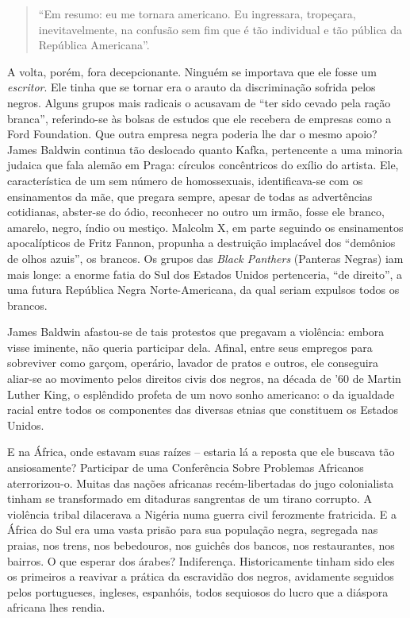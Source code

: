 \documentclass[
  letterpaper,
  DIV=11,
  numbers=noendperiod]{scrreprt}
\begin{document}
\begin{quote}
``Em resumo: eu me tornara americano. Eu ingressara, tropeçara,
inevitavelmente, na confusão sem fim que é tão individual e tão pública
da República Americana''.
\end{quote}

A volta, porém, fora decepcionante. Ninguém se importava que ele fosse
um \emph{escritor}. Ele tinha que se tornar era o arauto da
discriminação sofrida pelos negros. Alguns grupos mais radicais o
acusavam de ``ter sido cevado pela ração branca'', referindo-se às
bolsas de estudos que ele recebera de empresas como a Ford Foundation.
Que outra empresa negra poderia lhe dar o mesmo apoio? James Baldwin
continua tão deslocado quanto Kafka, pertencente a uma minoria judaica
que fala alemão em Praga: círculos concêntricos do exílio do artista.
Ele, característica de um sem número de homossexuais, identificava-se
com os ensinamentos da mãe, que pregara sempre, apesar de todas as
advertências cotidianas, abster-se do ódio, reconhecer no outro um
irmão, fosse ele branco, amarelo, negro, índio ou mestiço. Malcolm X, em
parte seguindo os ensinamentos apocalípticos de Fritz Fannon, propunha a
destruição implacável dos ``demônios de olhos azuis'', os brancos. Os
grupos das \emph{Black Panthers} (Panteras Negras) iam mais longe: a
enorme fatia do Sul dos Estados Unidos pertenceria, ``de direito'', a
uma futura República Negra Norte-Americana, da qual seriam expulsos
todos os brancos.

James Baldwin afastou-se de tais protestos que pregavam a violência:
embora visse iminente, não queria participar dela. Afinal, entre seus
empregos para sobreviver como garçom, operário, lavador de pratos e
outros, ele conseguira aliar-se ao movimento pelos direitos civis dos
negros, na década de '60 de Martin Luther King, o esplêndido profeta de
um novo sonho americano: o da igualdade racial entre todos os
componentes das diversas etnias que constituem os Estados Unidos.

E na África, onde estavam suas raízes -- estaria lá a reposta que ele
buscava tão ansiosamente? Participar de uma Conferência Sobre Problemas
Africanos aterrorizou-o. Muitas das nações africanas recém-libertadas do
jugo colonialista tinham se transformado em ditaduras sangrentas de um
tirano corrupto. A violência tribal dilacerava a Nigéria numa guerra
civil ferozmente fratricida. E a África do Sul era uma vasta prisão para
sua população negra, segregada nas praias, nos trens, nos bebedouros,
nos guichês dos bancos, nos restaurantes, nos bairros. O que esperar dos
árabes? Indiferença. Historicamente tinham sido eles os primeiros a
reavivar a prática da escravidão dos negros, avidamente seguidos pelos
portugueses, ingleses, espanhóis, todos sequiosos do lucro que a
diáspora africana lhes rendia.
\end{document}
